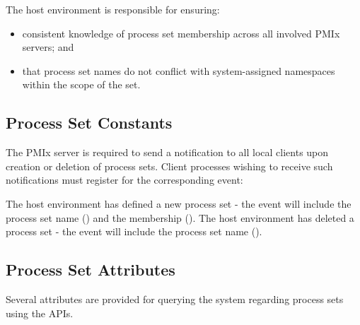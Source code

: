 \advicermstart
The host environment is responsible for ensuring:

\begin{itemize}
    \item consistent knowledge of process set membership across all involved
    \ac{PMIx} servers; and
    \item that process set names do not conflict with system-assigned namespaces within the scope of the set.
\end{itemize}

\advicermend


\subsection{Process Set Constants}

The \ac{PMIx} server is required to send a notification to all local clients upon creation or deletion of process sets. Client processes wishing to receive such
notifications must register for the corresponding event:

\begin{constantdesc}
%
The host environment has defined a new process set - the event will include the process set name () and the membership ().
%
The host environment has deleted a process set - the event will include the process set name ().
%
\end{constantdesc}


\subsection{Process Set Attributes}

Several attributes are provided for querying the system regarding process sets using the  \acp{API}.

%
%
%
%

